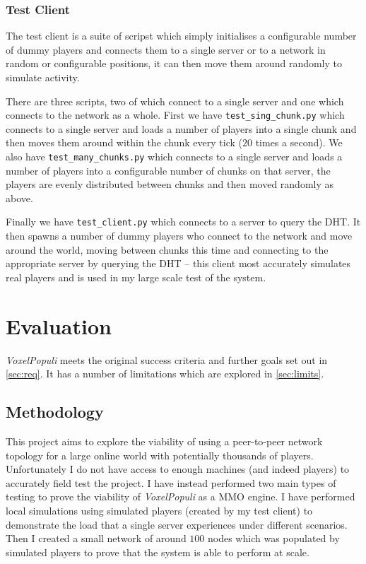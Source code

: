 \documentclass[12pt,notitlepage,a4paper]{report}
\newcommand{\voxpop}{\emph{VoxelPopuli}}
\begin{document}
	\subsection{Test Client}
	The test client is a suite of scripst which simply initialises a configurable number of dummy players and connects them to a single server or to a network in random or configurable positions, it can then move them around randomly to simulate activity.
	
	There are three scripts, two of which connect to a single server and one which connects to the network as a whole. First we have {\tt test\_sing\_chunk.py} which connects to a single server and loads a number of players into a single chunk and then moves them around within the chunk every tick ($20$ times a second). We also have {\tt test\_many\_chunks.py} which connects to a single server and loads a number of players into a configurable number of chunks on that server, the players are evenly distributed between chunks and then moved randomly as above.
	
	Finally we have {\tt test\_client.py} which connects to a server to query the DHT. It then spawns a number of dummy players who connect to the network and move around the world, moving between chunks this time and connecting to the appropriate server by querying the DHT -- this client most accurately simulates real players and is used in my large scale test of the system.
		
	\clearpage
	\chapter{Evaluation}
	\voxpop{} meets the original success criteria and further goals set out in \cref{sec:req}. It has a number of limitations which are explored in \cref{sec:limits}.
	
	\section{Methodology}
	This project aims to explore the viability of using a peer-to-peer network topology for a large online world with potentially thousands of players. Unfortunately I do not have access to enough machines (and indeed players) to accurately field test the project. I have instead performed two main types of testing to prove the viability of \voxpop{} as a MMO engine. I have performed local simulations using simulated players (created by my test client) to demonstrate the load that a single server experiences under different scenarios. Then I created a small network of around $100$ nodes which was populated by simulated players to prove that the system is able to perform at scale.
	
\end{document}
